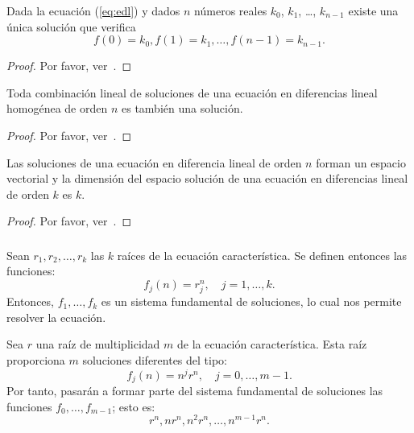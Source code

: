\begin{frame}

\begin{theorem}
	Dada la ecuación (\ref{eq:edl}) y dados $n$ números reales $k_{0}$, $k_{1}$, \ldots, $k_{n-1}$ existe una única solución que verifica \[ f\left(0\right)=k_{0},f\left(1\right)=k_{1},\ldots,f\left(n-1\right)=k_{n-1}. \]
\end{theorem}
\begin{proof}
	Por favor, ver~\cite{Mariconda2016}.
\end{proof}

\begin{theorem}
	Toda combinación lineal de soluciones de una ecuación en diferencias lineal homogénea de orden $n$ es también una solución.
\end{theorem}
\begin{proof}
		Por favor, ver~\cite{Mariconda2016}.
\end{proof}

\begin{theorem}
	Las soluciones de una ecuación en diferencia lineal de orden $n$ forman un espacio vectorial y la dimensión del espacio solución de una ecuación en diferencias lineal de orden $k$ es $k$.
\end{theorem}
\begin{proof}
		Por favor, ver~\cite{Mariconda2016}.
\end{proof}
\end{frame}

\begin{frame}
\frametitle{\subsubsecname}

\begin{definition}
	Sean $r_{1}, r_{2},\ldots, r_{k}$ las $k$ raíces de la ecuación característica. Se definen entonces las funciones: \[ f_{j}(n)=r^{n}_{j},\quad j=1,\ldots,k. \] Entonces, $f_{1},\ldots,f_{k}$ es un sistema fundamental de soluciones, lo cual nos permite resolver la ecuación. %
\end{definition}

\begin{definition}
	Sea $r$ una raíz de multiplicidad $m$ de la ecuación característica. Esta raíz proporciona $m$ soluciones diferentes del tipo: \[ f_{j}(n)=n^{j}r^{n},\quad j= 0,\ldots,m-1. \] Por tanto, pasarán a formar parte del sistema fundamental de soluciones las funciones $f_{0},\ldots,f_{m-1}$; esto es: \[ r^{n},nr^{n},n^{2}r^{n},\ldots,n^{m-1}r^{n}. \]
\end{definition}
\end{frame}

